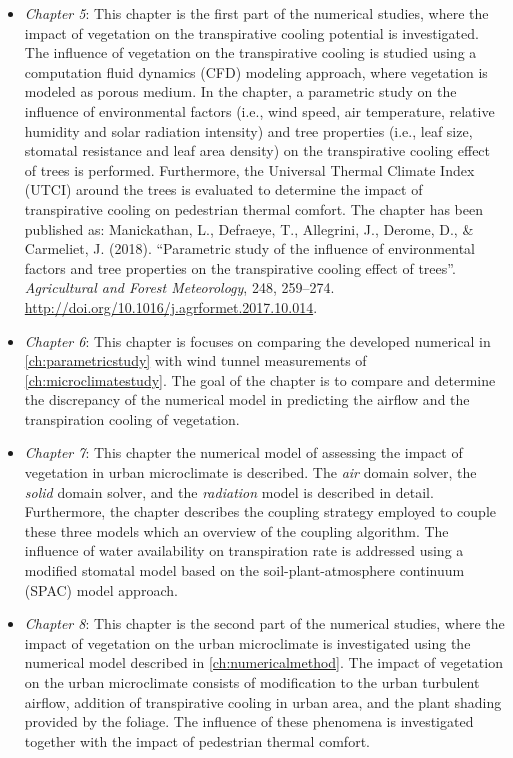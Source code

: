 \begin{itemize}
	\item \textit{Chapter 5}: This chapter is the first part of the numerical studies, where the impact of vegetation on the transpirative cooling potential is investigated. The influence of vegetation on the transpirative cooling is studied using a computation fluid dynamics (CFD) modeling approach, where vegetation is modeled as porous medium. In the chapter, a parametric study on the influence of environmental factors (i.e., wind speed, air temperature, relative humidity and solar radiation intensity) and tree properties (i.e., leaf size, stomatal resistance and leaf area density) on the transpirative cooling effect of trees is performed. Furthermore, the Universal Thermal Climate Index (UTCI) around the trees is evaluated to determine the impact of transpirative cooling on pedestrian thermal comfort. The chapter has been published as: Manickathan, L., Defraeye, T., Allegrini, J., Derome, D., \& Carmeliet, J. (2018). ``Parametric study of the influence of environmental factors and tree properties on the transpirative cooling effect of trees''. \textit{Agricultural and Forest Meteorology}, 248, 259–274. \url{http://doi.org/10.1016/j.agrformet.2017.10.014}.%
	
	\item \textit{Chapter 6}: This chapter is focuses on comparing the developed numerical in \cref{ch:parametricstudy} with wind tunnel measurements of \cref{ch:microclimatestudy}. The goal of the chapter is to compare and determine the discrepancy of the numerical model in predicting the airflow and the transpiration cooling of vegetation. 
	
	\item \textit{Chapter 7}: This chapter the numerical model of assessing the impact of vegetation in urban microclimate is described. The \textit{air} domain solver, the \textit{solid} domain solver, and the \textit{radiation} model is described in detail. Furthermore, the chapter describes the coupling strategy employed to couple these three models which an overview of the coupling algorithm. The influence of water availability on transpiration rate is addressed using a modified stomatal model based on the soil-plant-atmosphere continuum (SPAC) model approach. 
	
	\item \textit{Chapter 8}: This chapter is the second part of the numerical studies, where the impact of vegetation on the urban microclimate is investigated using the numerical model described in \cref{ch:numericalmethod}. The impact of vegetation on the urban microclimate consists of modification to the urban turbulent airflow, addition of transpirative cooling in urban area, and the plant shading provided by the foliage. The influence of these phenomena is investigated together with the impact of pedestrian thermal comfort. 
	

\end{itemize}
